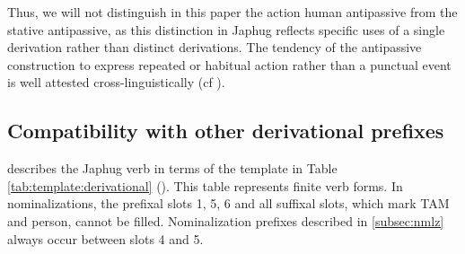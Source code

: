 \documentclass[oldfontcommands,oneside,a4paper,11pt]{article}
\begin{document}
Thus, we will not distinguish in this paper the action human antipassive from the stative antipassive, as this distinction in Japhug reflects specific uses of a single derivation rather than distinct derivations. The tendency of the antipassive construction to express repeated or habitual action rather than a punctual event
is well attested cross-linguistically (cf \citealt[91-2]{cooreman94antipassive}).


\subsection{Compatibility with other derivational prefixes} \label{subsec:compatibility}

\citealt{jacques12incorp} describes the Japhug verb  in terms of    the template in Table \ref{tab:template:derivational} (\citealt{jacques12incorp}). This table represents finite verb forms. In nominalizations, the prefixal slots 1, 5, 6 and all suffixal slots, which mark TAM and person, cannot be filled. Nominalization prefixes described in \ref{subsec:nmlz} always occur between slots 4 and 5.
\end{document}
